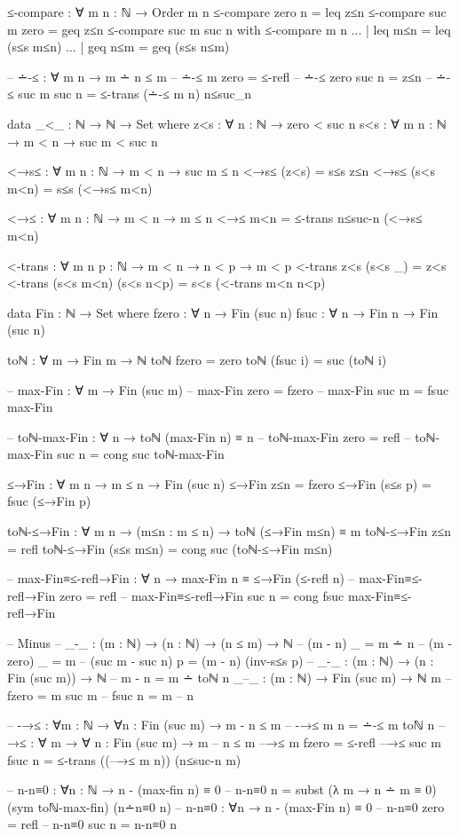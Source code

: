 \documentclass{article}
\begin{document}
\begin{prev}
\begin{code}
≤-compare : ∀ {m n : ℕ} → Order m n
≤-compare {zero} {n} = leq z≤n
≤-compare {suc m} {zero} = geq z≤n
≤-compare {suc m} {suc n} with ≤-compare {m} {n}
... | leq m≤n = leq (s≤s m≤n)
... | geq n≤m = geq (s≤s n≤m)

-- ∸-≤ : ∀ {m n} → m ∸ n ≤ m
-- ∸-≤ {m} {zero} = ≤-refl
-- ∸-≤ {zero} {suc n} = z≤n
-- ∸-≤ {suc m} {suc n} = ≤-trans (∸-≤ {m} {n}) n≤suc_n

data _<_ : ℕ → ℕ → Set where
    z<s : ∀ {n : ℕ} → zero < suc n
    s<s : ∀ {m n : ℕ} → m < n → suc m < suc n

<→s≤ : ∀ {m n : ℕ} → m < n → suc m ≤ n
<→s≤ (z<s) = s≤s z≤n
<→s≤ (s<s m<n) = s≤s (<→s≤ m<n)

<→≤ : ∀ {m n : ℕ} → m < n → m ≤ n
<→≤ m<n = ≤-trans n≤suc-n (<→s≤ m<n)

<-trans : ∀ {m n p : ℕ} → m < n → n < p → m < p
<-trans z<s (s<s _) = z<s
<-trans (s<s m<n) (s<s n<p) = s<s (<-trans m<n n<p)

data Fin : ℕ → Set where
  fzero : ∀ {n} → Fin (suc n)
  fsuc : ∀ {n} → Fin n → Fin (suc n)

toℕ : ∀ {m} → Fin m → ℕ
toℕ fzero = zero
toℕ (fsuc i) = suc (toℕ i)

-- max-Fin : ∀ {m} → Fin (suc m)
-- max-Fin {zero} = fzero
-- max-Fin {suc m} = fsuc max-Fin

-- toℕ-max-Fin : ∀ {n} → toℕ (max-Fin {n}) ≡ n
-- toℕ-max-Fin {zero} = refl
-- toℕ-max-Fin {suc n} = cong suc toℕ-max-Fin

≤→Fin : ∀ {m n} → m ≤ n → Fin (suc n)
≤→Fin z≤n = fzero
≤→Fin (s≤s p) = fsuc (≤→Fin p)

toℕ-≤→Fin : ∀ {m n} → (m≤n : m ≤ n) → toℕ (≤→Fin m≤n) ≡ m
toℕ-≤→Fin z≤n = refl
toℕ-≤→Fin (s≤s m≤n) = cong suc (toℕ-≤→Fin m≤n)

-- max-Fin≡≤-refl→Fin : ∀ {n} →  max-Fin {n} ≡ ≤→Fin (≤-refl {n})
-- max-Fin≡≤-refl→Fin {zero} = refl
-- max-Fin≡≤-refl→Fin {suc n} = cong fsuc max-Fin≡≤-refl→Fin

-- Minus
-- _-_ : (m : ℕ) → (n : ℕ) → (n ≤ m) → ℕ
-- (m - n) _ = m ∸ n
-- (m - zero) _ = m
-- (suc m - suc n) p = (m - n) (inv-s≤s p)
-- _-_ : (m : ℕ) → (n : Fin (suc m)) → ℕ
-- m - n = m ∸ toℕ n
_–_ : (m : ℕ) → Fin (suc m) → ℕ
m – fzero = m
suc m – fsuc n = m – n

-- -→≤ : ∀{m : ℕ} → ∀{n : Fin (suc m)} → m - n ≤ m
-- -→≤ {m} {n} = ∸-≤ {m} {toℕ n}
–→≤ : ∀ {m} → ∀ {n : Fin (suc m)} → m – n ≤ m
–→≤ {m} {fzero} = ≤-refl
–→≤ {suc m} {fsuc n} = ≤-trans ((–→≤ {m} {n})) (n≤suc-n {m})

-- n-n≡0 : ∀{n : ℕ} → n - (max-fin {n}) ≡ 0
-- n-n≡0 {n} = subst (λ m → n ∸ m ≡ 0) (sym toℕ-max-fin) (n∸n≡0 {n})
-- n-n≡0 : ∀{n} → n - (max-Fin {n}) ≡ 0
-- n-n≡0 {zero} = refl
-- n-n≡0 {suc n} = n-n≡0 {n}


\end{code}
\end{prev}
\end{document}
